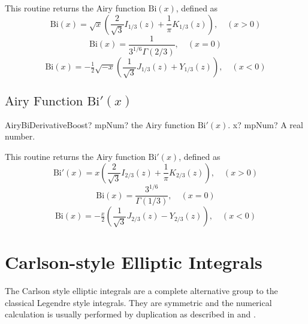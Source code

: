 \vspace{0.3cm}
This routine returns the Airy function $\text{Bi}(x)$, defined as
\begin{equation}
	\text{Bi}(x) = \sqrt{x} \left(\frac{2}{\sqrt{3}}I_{1/3}(z) + \frac{1}{\pi} K_{1/3}(z) \right), \quad (x>0)
\end{equation}
\begin{equation}
	\text{Bi}(x) = \frac{1}{3^{1/6}\Gamma(2/3)} , \quad (x=0)
\end{equation}
\begin{equation}
	\text{Bi}(x) = -\tfrac{1}{2} \sqrt{-x} \left(\frac{1}{\sqrt{3}} J_{1/3}(z) + Y_{1/3}(z) \right), \quad (x<0)
\end{equation}




\subsection{\texorpdfstring{$\text{Airy Function Bi}'(x)$}{BiPx}}

\begin{mpFunctionsExtract}
	\mpFunctionOne
	{AiryBiDerivativeBoost? mpNum? the Airy function $\text{Bi}'(x)$.}
	{x? mpNum? A real number.}
\end{mpFunctionsExtract}

\vspace{0.3cm}
This routine returns the Airy function $\text{Bi}'(x)$, defined as
\begin{equation}
	\text{Bi}'(x) = x \left(\frac{2}{\sqrt{3}}I_{2/3}(z) + \frac{1}{\pi} K_{2/3}(z) \right), \quad (x>0)
\end{equation}
\begin{equation}
	\text{Bi}(x) = \frac{3^{1/6}}{\Gamma(1/3)} , \quad (x=0)
\end{equation}
\begin{equation}
	\text{Bi}(x) = -\tfrac{x}{2} \left(\frac{1}{\sqrt{3}} J_{2/3}(z) - Y_{2/3}(z) \right), \quad (x<0)
\end{equation}


\section{Carlson-style Elliptic Integrals}
\label{EllipticIntegralCarlsonBoost}


The Carlson style elliptic integrals are a complete alternative group to the classical
Legendre style integrals. They are symmetric and the numerical calculation is usually
performed by duplication as described in  \cite{Carlson_1994} and  \cite{Carlson_1995}.

